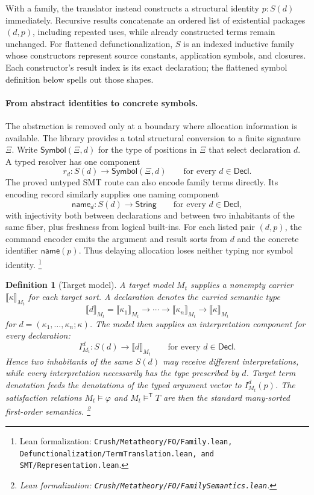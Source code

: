 \documentclass[11pt]{article}
\newtheorem{definition}{Definition}[section]
\theoremstyle{remark}
\newcommand{\leanfile}[1]{\footnote{Lean formalization: \texttt{Crush/Metatheory/#1}.}}
\newcommand{\leanfiles}[1]{\footnote{Lean formalization: \texttt{Crush/Metatheory/#1}.}}
\newcommand{\sat}{\models}
\newcommand{\satt}{\models^{\mathsf T}}
\begin{document}
With a family, the translator instead constructs a structural identity
$p:S(d)$ immediately. Recursive results concatenate an ordered list of
existential packages $(d,p)$, including repeated uses, while already
constructed terms remain unchanged.
For flattened defunctionalization, $S$ is an indexed inductive family whose
constructors represent source constants, application symbols, and closures.
Each constructor's result index is its exact declaration; the flattened symbol
definition below spells out those shapes.

\paragraph{From abstract identities to concrete symbols.}
The abstraction is removed only at a boundary where allocation information is
available. The library provides a total structural conversion to a finite
signature $\Xi$. Write $\mathsf{Symbol}(\Xi,d)$ for the type of positions in
$\Xi$ that select declaration $d$. A typed resolver has one component
\[
 r_d:S(d)\longrightarrow\mathsf{Symbol}(\Xi,d)
 \qquad\text{for every }d\in\mathsf{Decl}.
\]
The proved untyped SMT route can also encode family terms directly. Its encoding
record similarly supplies one naming component
\[
 \mathsf{name}_d:S(d)\longrightarrow\mathsf{String}
 \qquad\text{for every }d\in\mathsf{Decl},
\]
with injectivity both between declarations and between two inhabitants of the
same fiber, plus freshness from logical built-ins. For each listed pair $(d,p)$,
the command encoder emits the argument and result sorts from $d$ and the concrete
identifier $\mathsf{name}(p)$. Thus delaying allocation loses neither typing nor
symbol identity.
\leanfiles{FO/Family.lean, Defunctionalization/TermTranslation.lean, and SMT/Representation.lean}

\begin{definition}[Target model]
A target model $M_t$ supplies a nonempty carrier
$\llbracket\kappa\rrbracket_{M_t}$ for each target sort. A declaration denotes
the curried semantic type
\[
 \llbracket d\rrbracket_{M_t}
 =
 \llbracket\kappa_1\rrbracket_{M_t}\to\cdots\to
 \llbracket\kappa_n\rrbracket_{M_t}\to
 \llbracket\kappa\rrbracket_{M_t}
\]
for $d=(\kappa_1,\ldots,\kappa_n;\kappa)$. The model then supplies an
interpretation component for every declaration:
\[
 I^d_{M_t}:S(d)\longrightarrow\llbracket d\rrbracket_{M_t}
 \qquad\text{for every }d\in\mathsf{Decl}.
\]
Hence two inhabitants of the same $S(d)$ may receive different interpretations,
while every interpretation necessarily has the type prescribed by $d$. Target
term denotation feeds the denotations of the typed argument vector to
$I^d_{M_t}(p)$. The satisfaction relations $M_t\sat\varphi$ and $M_t\satt T$ are
then the standard many-sorted first-order semantics.
\leanfile{FO/FamilySemantics.lean}
\end{definition}
\end{document}
